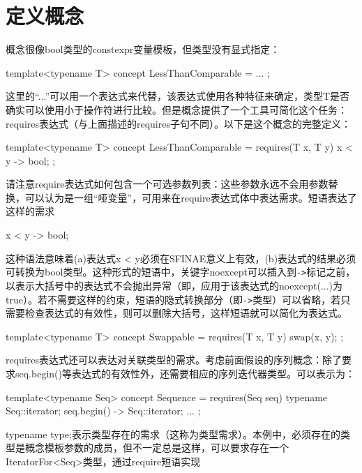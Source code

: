 \section{定义概念}
概念很像bool类型的constexpr变量模板，但类型没有显式指定：

\begin{cpp}
template<typename T> concept LessThanComparable = ... ;
\end{cpp}

这里的“...”可以用一个表达式来代替，该表达式使用各种特征来确定，类型T是否确实可以使用小于操作符进行比较。但是概念提供了一个工具可简化这个任务：requires表达式（与上面描述的requires子句不同）。以下是这个概念的完整定义：

\begin{cpp}
template<typename T>
concept LessThanComparable = requires(T x, T y) {
	{ x < y } -> bool;
};
\end{cpp}

请注意require表达式如何包含一个可选参数列表：这些参数永远不会用参数替换，可以认为是一组“哑变量”，可用来在require表达式体中表达需求。短语表达了这样的需求

\begin{cpp}
{ x < y } -> bool;
\end{cpp}

这种语法意味着(a)表达式x < y必须在SFINAE意义上有效，(b)表达式的结果必须可转换为bool类型。这种形式的短语中，关键字noexcept可以插入到\texttt{->}标记之前，以表示大括号中的表达式不会抛出异常（即，应用于该表达式的noexcept(...)为true）。若不需要这样的约束，短语的隐式转换部分（即\texttt{->}类型）可以省略，若只需要检查表达式的有效性，则可以删除大括号，这样短语就可以简化为表达式。

\begin{cpp}
template<typename T>
concept Swappable = requires(T x, T y) {
	swap(x, y);
};
\end{cpp}

requires表达式还可以表达对关联类型的需求。考虑前面假设的序列概念：除了要求seq.begin()等表达式的有效性外，还需要相应的序列迭代器类型。可以表示为：

\begin{cpp}
template<typename Seq>
concept Sequence = requires(Seq seq) {
	typename Seq::iterator;
	{ seq.begin() } -> Seq::iterator;
	...
};
\end{cpp}

typename type;表示类型存在的需求（这称为类型需求）。本例中，必须存在的类型是概念模板参数的成员，但不一定总是这样，可以要求存在一个IteratorFor<Seq>类型，通过require短语实现

